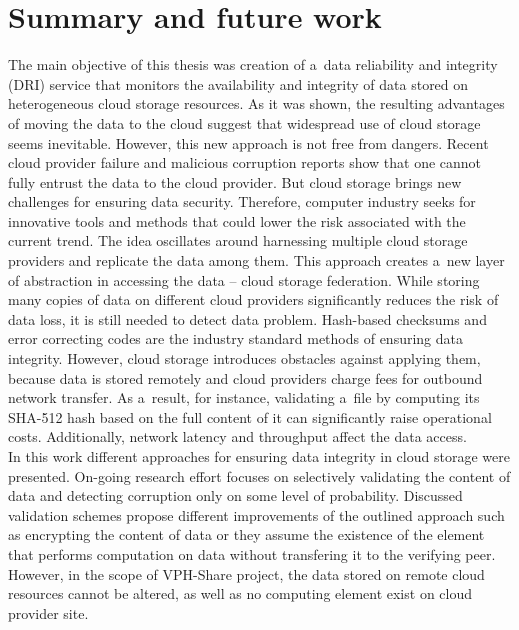 \chapter{Summary and future work}
\label{cha:conclusions}

The main objective of this thesis was creation of a~data reliability
and integrity (DRI) service that monitors the availability and integrity
of data stored on heterogeneous cloud storage resources. As it was shown,
the resulting advantages of moving the data to the cloud suggest that widespread
use of cloud storage seems inevitable. However, this new approach is not free
from dangers. Recent cloud provider failure and malicious corruption reports
\cite{cloud-downtime-stats} 
show that
one cannot fully entrust the data to the cloud provider. But cloud storage brings
new challenges for ensuring data security. Therefore, computer industry seeks for
innovative tools and methods that could lower the risk associated with the current
trend. The idea oscillates around harnessing multiple cloud storage providers
and replicate the data among them. This approach creates a~new layer of abstraction
in accessing the data -- cloud storage federation. While storing many copies of 
data on different cloud providers significantly reduces the risk of data loss, it
is still needed to detect data problem. Hash-based checksums and error correcting codes
are the industry standard methods of ensuring data integrity. However, cloud storage
introduces obstacles against applying them, because data is stored remotely and cloud
providers charge fees for outbound network transfer. As a~result, for instance, 
validating a~file by computing its SHA-512 hash based on the full content of it can
significantly raise operational costs. Additionally, network latency and throughput
affect the data access.\\

In this work different approaches for ensuring data integrity in cloud storage were
presented. On-going research effort focuses on selectively validating the content of
data and detecting corruption only on some level of probability. Discussed validation
schemes propose different improvements of the outlined approach such as encrypting
the content of data or they assume the existence of the element that performs computation
on data without transfering it to the verifying peer. However, in the scope of VPH-Share
project, the data stored on remote cloud resources cannot be altered, as well as no
computing element exist on cloud provider site.\\

